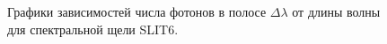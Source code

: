 \documentclass[a4paper]{article}
\begin{document}
\begin{figure}[h]
\begin{minipage}[h]{0.5\linewidth}
\end{minipage}
\begin{minipage}[h]{0.5\linewidth}
\end{minipage}
\begin{minipage}[h]{0.5\linewidth}
\end{minipage}
\caption{Графики зависимостей числа фотонов в полосе $\Delta\lambda$ от длины волны для спектральной щели SLIT6.}
\end{figure}
\end{document}
